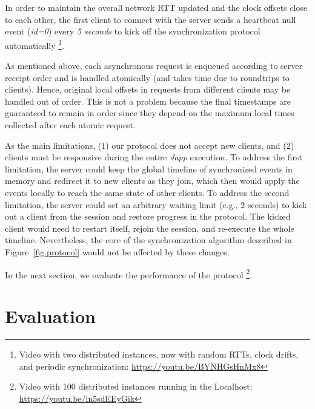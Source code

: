 \documentclass[sigplan,screen]{acmart}
\newcommand{\dapp}{\emph{dapp}\xspace}
\begin{document}
In order to maintain the overall network RTT updated and the clock offsets
close to each other, the first client to connect with the server sends a
heartbeat null event (\emph{id=0}) every \emph{5 seconds} to kick off the
synchronization protocol automatically%
\footnote {
    Video with two distributed instances, now with random RTTs, clock drifts,
    and periodic synchronization:
    \url{https://youtu.be/BYNHGsHnMx8}
}.

As mentioned above, each asynchronous request is enqueued according to server
receipt order and is handled atomically (and takes time due to roundtrips to
clients).
Hence, original local offsets in requests from different clients may be
handled out of order.
This is not a problem because the final timestamps are guaranteed to remain in
order since they depend on the maximum local times collected after each
atomic request.

As the main limitations,
    (1) our protocol does not accept new clients, and
    (2) clients must be responsive during the entire \dapp execution.
%
To address the first limitation, the server could keep the global timeline of
synchronized events in memory and redirect it to new clients as they join,
which then would apply the events locally to reach the same state of other
clients.
%
To address the second limitation, the server could set an arbitrary waiting
limit (e.g., 2 seconds) to kick out a client from the session and restore
progress in the protocol.
The kicked client would need to restart itself, rejoin the session, and
re-execute the whole timeline.
%
%
Nevertheless, the core of the synchronization algorithm described in
Figure~\ref{fig.protocol} would not be affected by these changes.

In the next section, we evaluate the performance of the protocol%
\footnote {
    Video with 100 distributed instances running in the Localhost:
    \url{https://youtu.be/in5sdEEyGik}
}.

\section{Evaluation}
\label{sec.eval}
\end{document}

